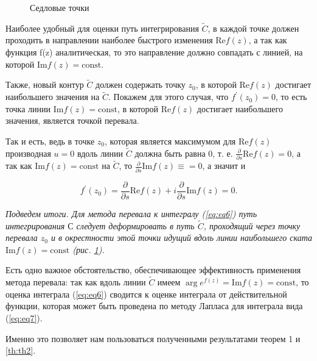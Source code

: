 \documentclass[14pt]{extarticle}
\renewcommand{\Re}{\mathrm{Re}}
\renewcommand{\Im}{\mathrm{Im}}
\newcommand{\const}{\mathrm{const}}
\begin{document}
\begin{figure}[h]
	\caption{Седловые точки}
	\label{ris:image2}
\end{figure}

Наиболее удобный для оценки путь интегрирования $\widetilde{C}$, в каждой точке должен проходить в направлении наиболее быстрого изменения $\Re f(z)$, а так как функция f(z) аналитическая, то это направление должно совпадать с линией, на которой $\Im f(z) = \const$. 

Также, новый контур $\widetilde{C}$ должен содержать точку $z_0$, в которой $\Re f(z)$ достигает наибольшего значения на $\widetilde{C}$. Покажем для этого случая, что $f^\prime (z_0) = 0$, то есть точка линии $\Im f(z) = \const$, в которой $\Re f (z)$ достигает наибольшего значения, является точкой перевала.

Так и есть, ведь в точке $z_0$, которая является максимумом для $\Re f (z)$ производная $u=0$ вдоль линии $\widetilde{C}$ должна быть равна 0, т. е. $\frac{\partial}{\partial s}\Re f(z)=0$, а так как $\Im f(z) = \const$ на $\widetilde{C}$, то $\frac{\partial}{\partial s} \Im f(z) \equiv = 0$, а значит и 

$$
f^\prime(z_0) = \frac{\partial}{\partial s} \Re f(z) + i\frac{\partial}{\partial s} \Im f(z) = 0.
$$ 
  
\textit{Подведем итоги. Для метода перевала к интегралу (\ref{eq:eq6}) путь интегрирования $С$ следует деформировать в путь $\widetilde{C}$, проходящий через точку перевала $z_0$ и в окрестности этой точки идущий вдоль линии наибольшего ската $\Im f(z) = \const$ (рис. \ref{ris:image2}).}

Есть одно важное обстоятельство, обеспечивающее эффективность применения метода перевала: так как вдоль линии $\widetilde{C}$ имеем $\arg e^{f(z)} = \Im f(z) = \const$, то оценка интеграла (\ref{eq:eq6}) сводится к оценке интеграла от действительной функции, которая может быть проведена по методу Лапласа для интеграла вида (\ref{eq:eq7}).  

Именно это позволяет нам пользоваться полученными результатами теорем 1 и \ref{th:th2}. 
\end{document}
